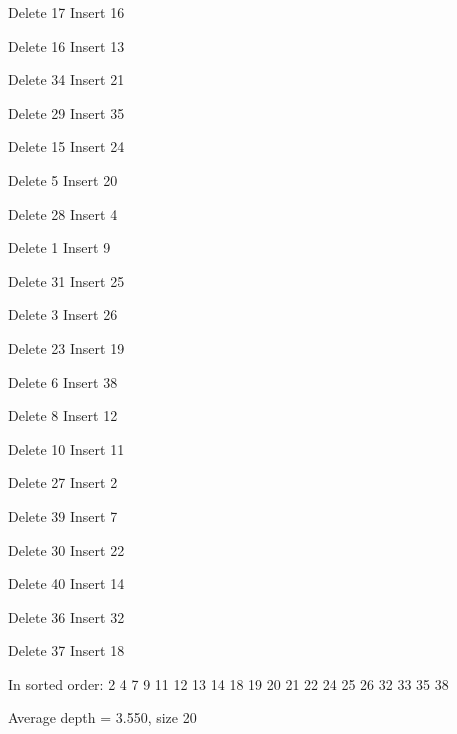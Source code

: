 \documentclass[a4paper,11pt]{article}
\begin{document}
Delete 17 Insert 16

Delete 16 Insert 13

Delete 34 Insert 21

Delete 29 Insert 35

Delete 15 Insert 24

Delete 5 Insert 20

Delete 28 Insert 4

Delete 1 Insert 9

Delete 31 Insert 25

Delete 3 Insert 26

Delete 23 Insert 19

Delete 6 Insert 38

Delete 8 Insert 12

Delete 10 Insert 11

Delete 27 Insert 2

Delete 39 Insert 7

Delete 30 Insert 22

Delete 40 Insert 14

Delete 36 Insert 32

Delete 37 Insert 18

In sorted order: 2 4 7 9 11 12 13 14 18 19 20 21 22 24 25 26 32 33 35 38 

Average depth = 3.550, size 20
\end{document}
